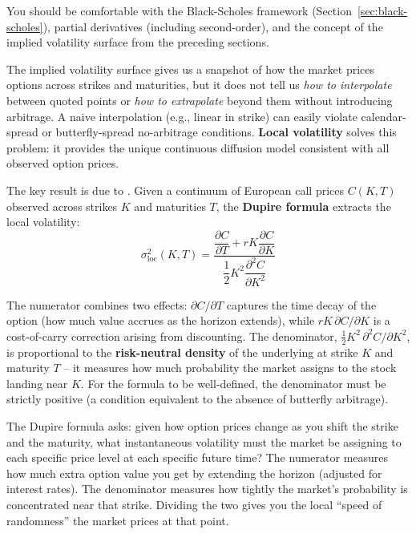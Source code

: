 \begin{prereq}
You should be comfortable with the Black-Scholes framework (Section~\ref{sec:black-scholes}), partial derivatives (including second-order), and the concept of the implied volatility surface from the preceding sections.
\end{prereq}

The implied volatility surface gives us a snapshot of how the market prices options across strikes and maturities, but it does not tell us \emph{how to interpolate} between quoted points or \emph{how to extrapolate} beyond them without introducing arbitrage.
A naive interpolation (e.g., linear in strike) can easily violate calendar-spread or butterfly-spread no-arbitrage conditions.
\textbf{Local volatility} solves this problem: it provides the unique continuous diffusion model consistent with all observed option prices.

The key result is due to \citet{Dupire1994}.
Given a continuum of European call prices $C(K,T)$ observed across strikes $K$ and maturities $T$, the \textbf{Dupire formula} extracts the local volatility:
\begin{equation}\label{eq:dupire}
  \sigma_{\text{loc}}^2(K,T) = \frac{\dfrac{\partial C}{\partial T} + rK\dfrac{\partial C}{\partial K}}{\dfrac{1}{2}K^2 \dfrac{\partial^2 C}{\partial K^2}}
\end{equation}

The numerator combines two effects: $\partial C / \partial T$ captures the time decay of the option (how much value accrues as the horizon extends), while $rK\,\partial C / \partial K$ is a cost-of-carry correction arising from discounting.
The denominator, $\frac{1}{2}K^2\,\partial^2 C / \partial K^2$, is proportional to the \textbf{risk-neutral density} of the underlying at strike $K$ and maturity $T$ -- it measures how much probability the market assigns to the stock landing near $K$.
For the formula to be well-defined, the denominator must be strictly positive (a condition equivalent to the absence of butterfly arbitrage).

\begin{intuition}
The Dupire formula asks: given how option prices change as you shift the strike and the maturity, what instantaneous volatility must the market be assigning to each specific price level at each specific future time?
The numerator measures how much extra option value you get by extending the horizon (adjusted for interest rates).
The denominator measures how tightly the market's probability is concentrated near that strike.
Dividing the two gives you the local ``speed of randomness'' the market prices at that point.
\end{intuition}


